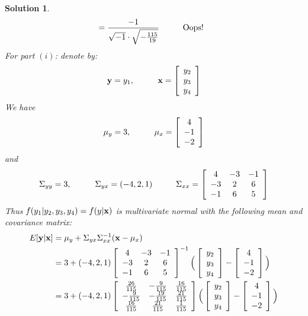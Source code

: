 \documentclass[11pt]{article}
\newtheorem{sol}{Solution}
\begin{document}
\begin{sol}
\begin{align*}
		&= \frac{-1}{\sqrt{-1}\cdot \sqrt{-\frac{115}{19}}} \hskip 1cm \text{Oops!}
	\end{align*}
	For part $(i)$:\vskip 2mm
	denote by:
	\begin{align*}
		{\bf y} = y_1, \hskip 1cm{\bf x} = \left[\begin{array}{c} y_2\\ y_3\\ y_4\end{array}\right]
	\end{align*}
	We have
	\begin{align*}
		{\bf \mu}_y = 3, \hskip 1cm {\bf \mu}_x =  \left[\begin{array}{c} 4\\ -1\\ -2\end{array}\right]
	\end{align*}
	and
	\begin{align*}
		\Sigma_{yy} = 3, \hskip 1cm \Sigma_{yx} = (-4, 2, 1) \hskip 1cm \Sigma_{xx} = \left[\begin{array}{ccc} 4&-3&-1\\ -3&2&6\\ -1&6&5\end{array}\right]
	\end{align*}
	Thus $f(y_1|y_2, y_3, y_4) = f(y|{\bf x})$ is multivariate normal with the following mean and covariance matrix:
	\begin{align*}
		E[{\bf y}|{\bf x}] &= {\bf \mu}_y  + \Sigma_{yx}\Sigma_{xx}^{-1}({\bf x} - {\bf \mu}_x)\\
		&= 3 + (-4, 2, 1)\left[\begin{array}{ccc} 4&-3&-1\\ -3&2&6\\ -1&6&5\end{array}\right]^{-1}\Big(\left[\begin{array}{c} y_2\\ y_3\\ y_4\end{array}\right] - \left[\begin{array}{c} 4\\ -1\\ -2\end{array}\right]\Big)\\
		&= 3 + (-4, 2, 1)\left[\begin{array}{ccc} \frac{26}{115}& -\frac{9}{115}&\frac{16}{115}\\ -\frac{9}{115}&-\frac{19}{115} &\frac{21}{115}\\ \frac{16}{115}&\frac{21}{115} &\frac{1}{115}\end{array}\right]\Big(\left[\begin{array}{c} y_2\\ y_3\\ y_4\end{array}\right] - \left[\begin{array}{c} 4\\ -1\\ -2\end{array}\right]\Big)\\

\end{align*}
\end{sol}
\end{document}
